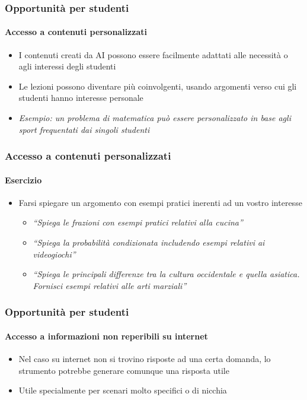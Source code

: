 \begin{contentframe}
    \frametitle{Opportunità per studenti}
    \framesubtitle{Accesso a contenuti personalizzati}

    \begin{itemize}
        \item I contenuti creati da AI possono essere facilmente adattati alle necessità o agli interessi degli studenti
        \item Le lezioni possono diventare più coinvolgenti, usando argomenti verso cui gli studenti hanno interesse personale

        \bigskip
        \item \textit{Esempio: un problema di matematica può essere personalizzato in base agli sport frequentati dai singoli studenti}
    \end{itemize}
\end{contentframe}

\begin{exerciseframe}
    \frametitle{Accesso a contenuti personalizzati}
    \framesubtitle{Esercizio}

    \begin{itemize}
        \item Farsi spiegare un argomento con esempi pratici inerenti ad un vostro interesse
        \begin{itemize}
            \item \textit{``Spiega le frazioni con esempi pratici relativi alla cucina''}
            \item \textit{``Spiega la probabilità condizionata includendo esempi relativi ai videogiochi''}
            \item \textit{``Spiega le principali differenze tra la cultura occidentale e quella asiatica. Fornisci esempi relativi alle arti marziali''}
        \end{itemize}
    \end{itemize}
\end{exerciseframe}

\begin{contentframe}
    \frametitle{Opportunità per studenti}
    \framesubtitle{Accesso a informazioni non reperibili su internet}

    \begin{itemize}
        \item Nel caso su internet non si trovino risposte ad una certa domanda, lo strumento potrebbe generare comunque una risposta utile

        \bigskip
        \item Utile specialmente per scenari molto specifici o di nicchia
    \end{itemize}
\end{contentframe}

